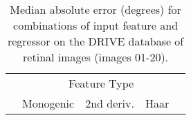 \begin{table}[b]
\centering
\begin{tabular}{l|c c c c}
							& \multicolumn{4}{c}{Feature Type} \\
							& Monogenic		& 2nd deriv.	& Haar				& \dtcwt{} \\
\hline

\end{tabular}
%
\caption{Median absolute error (degrees) for combinations of input feature and regressor on the DRIVE database of retinal images (images 01-20).}
\label{t:retinopathy}
\end{table}

%
